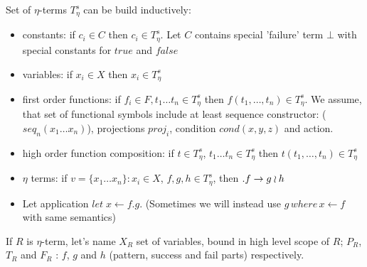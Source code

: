 \documentclass[10pt]{article}
\begin{document}
 Set of $\eta$-terms $T_{\eta}^s$ can be build inductively: 
\begin{itemize}
 \item constants: if $c_i \in C$ then $c_i \in T_{\eta}^s$. Let $C$ contains special 'failure' term $\bot$  with special constants for $true$ and $false$
 \item variables: if $x_i \in X$ then $x_i \in T_{\eta}^s$
 \item first order functions: if $f_i \in F, t_{1}\dots t_{n} \in T_{\eta}^s$ 
         then $f(t_1,\dots,t_n)\in T_{\eta}^s$. We assume, that set of functional
         symbols include at least sequence constructor: ($seq_n(x_1\dots x_n)$),
         projections $proj_i$, condition $cond(x,y,z)$ and action.
 \item high order function composition: if $t \in T_{\eta}^s$, 
     $t_{1}\dots t_{n} \in T_{\eta}^s$ 
         then $t(t_1,\dots,t_n)\in T_{\eta}^s$                                                  
 \item $\eta$ terms: if $v=\{x_1 \dots x_n\}:x_{i} \in X$, $f,g, h \in T_{\eta}^s$, then 
    $\let \,v . f \to g \wr h $       
 \item Let application $let\;x \leftarrow f . g$. (Sometimes we will instead 
   use $g\,where\,x\leftarrow f$ with same semantics) 
\end{itemize}

  If $R$ is $\eta$-term, let's name $X_{R}$ set of variables, bound in high level scope of
 $R$; $P_{R}$, $T_{R}$ and  $F_{R}$ : $f$, $g$ and $h$ (pattern, success and fail parts)  
  respectively.
\end{document}

